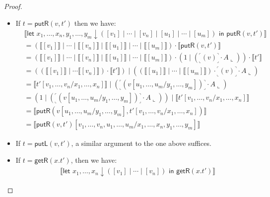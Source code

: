 \documentclass[10pt,a4paper]{amsart}
\theoremstyle{plain}
\newcommand{\putr}{\mathsf{putR}}
\newcommand{\getr}{\mathsf{getR}}
\newcommand{\putl}{\mathsf{putL}}
\newcommand{\corner}[1]{{\text{}^\ulcorner_\llcorner\!{#1}\!_\lrcorner^\urcorner}}
\newcommand{\asn}{\downarrow}
\newcommand{\seq}{,\!\ldots\!,}
\begin{document}
\begin{proof}
\begin{itemize}
\begin{align*}
      \\&= (\llbracket t_1[v_1^1 \seq v_1^{k_1}/x_1^1 \seq x_1^{k_1}] \rrbracket \mid \cdots \mid \llbracket t_m[v_m^1 \seq v_m^{k_m} / x_m^1 \seq x_m^{k_m}] \rrbracket) \cdot \llbracket r \rrbracket
      \\&= \llbracket \textsf{let } y_1\seq y_m \asn (t_1[v_1^1 \seq v_1^{k_1}/x_1^1\seq x_1^{k_1}] \mid \cdots \mid t_m[v_m^1 \seq v_m^{k_m} / x_m^1 \seq x_m^{k_m}]) \textsf{ in } r \rrbracket
    \end{align*}
  \item If $t = \putr(v,t')$ then we have: 
    \begin{align*}
      & \llbracket \textsf{let } x_1 \seq x_n,y_1\seq y_m \asn ([v_1] \mid \cdots \mid [v_n] \mid [u_1] \mid \cdots \mid [u_m]) \textsf{ in } \putr(v,t')\rrbracket
      \\&= (\llbracket [v_1] \rrbracket \mid \cdots \mid \llbracket [v_n] \rrbracket \mid \llbracket [u_1] \rrbracket \mid \cdots \mid \llbracket [u_m] \rrbracket) \cdot \llbracket \putr(v,t') \rrbracket
      \\&= (\llbracket [v_1] \rrbracket \mid \cdots \mid \llbracket [v_n] \rrbracket \mid \llbracket [u_1] \rrbracket \mid \cdots \mid \llbracket [u_m] \rrbracket) \cdot (1 \mid (\corner{(v)} \cdot A\llcorner)) \cdot \llbracket t' \rrbracket
      \\&= ((\llbracket [v_1] \rrbracket \mid \cdots \llbracket [v_n] \rrbracket) \cdot \llbracket t' \rrbracket) \mid ((\llbracket [u_1] \rrbracket \mid \cdots \mid \llbracket [u_m] \rrbracket) \cdot \corner{(v)} \cdot A\llcorner)
      \\&= \llbracket t'[v_1 \seq v_n/x_1 \seq x_n] \rrbracket \mid (\corner{( v[u_1\seq u_m / y_1 \seq y_m] )} \cdot A\llcorner)
      \\&= (1 \mid (\corner{( v[u_1\seq u_m / y_1 \seq y_m] )} \cdot A\llcorner)) \mid \llbracket t'[v_1 \seq v_n / x_1 \seq x_n] \rrbracket 
      \\&= \llbracket \putr(v[u_1\seq u_m/y_1\seq y_m],t'[v_1 \seq v_n/x_1 \seq x_n]) \rrbracket
      \\&= \llbracket \putr(v,t')[v_1\seq v_n,u_1 \seq u_m/x_1 \seq x_n,y_1 \seq y_m] \rrbracket
    \end{align*}
  \item If $t = \putl(v,t')$, a similar argument to the one above suffices.
  \item If $t = \getr(x.t')$, then we have:
    \begin{align*}
      & \llbracket \textsf{let } x_1 \seq x_n \asn ([v_1] \mid \cdots \mid [v_n]) \textsf{ in } \getr(x.t') \rrbracket

\end{align*}
\end{itemize}
\end{proof}
\end{document}
